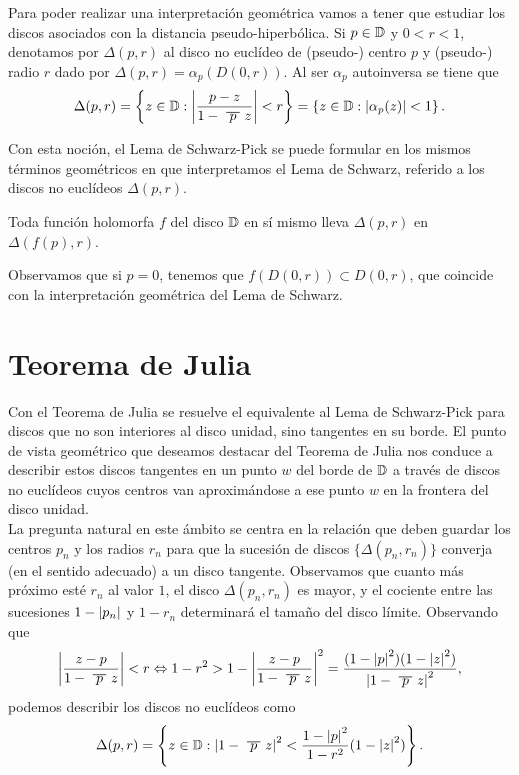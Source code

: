 Para poder realizar una interpretación geométrica vamos a tener que estudiar los discos asociados con la distancia pseudo-hiperbólica. Si $p \in \mathbb{D}$ y $0 < r < 1$, denotamos por $\Delta(p,r)$ al disco no euclídeo de (pseudo-) centro $p$ y (pseudo-) radio $r$ dado por $\Delta(p,r) = \alpha_p(D(0,r))$. Al ser $\alpha_p$ autoinversa se tiene que
\begin{equation*}
    \Delta(p,r) = \left\{z \in \disk: \abs{\frac{p-z}{1 - \xbar{p}z}} < r\right\} = \left\{z \in \disk: \abs{\alpha_p(z)} < 1\right\}.
\end{equation*}

Con esta noción, el Lema de Schwarz-Pick se puede formular en los mismos términos geométricos en que interpretamos el Lema de Schwarz, referido a los discos no euclídeos $\Delta(p,r)$. \\

\begin{theorem}
    Toda función holomorfa $f$ del disco $\mathbb{D}$ en sí mismo lleva $\Delta(p,r)$ en $\Delta(f(p),r)$.
\end{theorem}

Observamos que si $p = 0$, tenemos que $f(D(0,r)) \subset D(0,r)$, que coincide con la interpretación geométrica del Lema de Schwarz. \\

\section{Teorema de Julia}

Con el Teorema de Julia se resuelve el equivalente al Lema de Schwarz-Pick para discos que no son interiores al disco unidad, sino tangentes en su borde. El punto de vista geométrico que deseamos destacar del Teorema de Julia nos conduce a describir estos discos tangentes en un punto $w$ del borde de $\mathbb{D}$ a través de discos no euclídeos cuyos centros van aproximándose a ese punto $w$ en la frontera del disco unidad. \\

La pregunta natural en este ámbito se centra en la relación que deben guardar los centros $p_n$ y los radios $r_n$ para que la sucesión de discos $\{\Delta(p_n, r_n)\}$ converja (en el sentido adecuado) a un disco tangente. Observamos que cuanto más próximo esté $r_n$ al valor $1$, el disco $\Delta(p_n, r_n)$ es mayor, y el cociente entre las sucesiones $1 - \left\lvert p_n\right\rvert$ y $1 - r_n$ determinará el tamaño del disco límite. Observando que
\begin{equation*}
    \abs{\frac{z-p}{1 - \xbar{p}z}} < r \Leftrightarrow 1 - r^2 > 1 -  \abs{\frac{z-p}{1 - \xbar{p}z}}^2 = \frac{(1-\abs{p}^2)(1-\abs{z}^2)}{\abs{1-\xbar{p}z}^2},
\end{equation*}
podemos describir los discos no euclídeos como
\begin{equation*}
\Delta(p,r) = \left\{z \in \disk : \abs{1-\xbar{p}z}^2 < \frac{1-\abs{p}^2}{1-r^2} (1-\abs{z}^2)\right\}.
\end{equation*}

